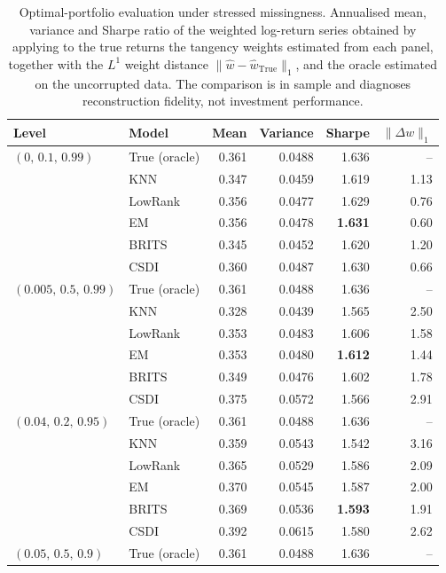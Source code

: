 \begin{table}[htbp]
  \centering
  \footnotesize
  \caption[Optimal-portfolio evaluation under stressed missingness]{Optimal-portfolio evaluation under stressed missingness. Annualised mean, variance and Sharpe ratio of the weighted log-return series obtained by applying to the true returns the tangency weights estimated from each panel, together with the $L^1$ weight distance $\lVert \hat w - \hat w_{\text{True}}\rVert_1$, and the oracle estimated on the uncorrupted data. The comparison is in sample and diagnoses reconstruction fidelity, not investment performance.}
  \label{tab:portfolio_stressed}
  \begin{tabular}{llrrrr}
    \toprule
    Level & Model & Mean & Variance & Sharpe & $\lVert \Delta w\rVert_1$ \\
    \midrule
    $(0,\, 0.1,\, 0.99)$ & True (oracle) & 0.361 & 0.0488 & 1.636 & -- \\
     & KNN & 0.347 & 0.0459 & 1.619 & 1.13 \\
     & LowRank & 0.356 & 0.0477 & 1.629 & 0.76 \\
     & EM & 0.356 & 0.0478 & \textbf{1.631} & 0.60 \\
     & BRITS & 0.345 & 0.0452 & 1.620 & 1.20 \\
     & CSDI & 0.360 & 0.0487 & 1.630 & 0.66 \\
    \midrule
    $(0.005,\, 0.5,\, 0.99)$ & True (oracle) & 0.361 & 0.0488 & 1.636 & -- \\
     & KNN & 0.328 & 0.0439 & 1.565 & 2.50 \\
     & LowRank & 0.353 & 0.0483 & 1.606 & 1.58 \\
     & EM & 0.353 & 0.0480 & \textbf{1.612} & 1.44 \\
     & BRITS & 0.349 & 0.0476 & 1.602 & 1.78 \\
     & CSDI & 0.375 & 0.0572 & 1.566 & 2.91 \\
    \midrule
    $(0.04,\, 0.2,\, 0.95)$ & True (oracle) & 0.361 & 0.0488 & 1.636 & -- \\
     & KNN & 0.359 & 0.0543 & 1.542 & 3.16 \\
     & LowRank & 0.365 & 0.0529 & 1.586 & 2.09 \\
     & EM & 0.370 & 0.0545 & 1.587 & 2.00 \\
     & BRITS & 0.369 & 0.0536 & \textbf{1.593} & 1.91 \\
     & CSDI & 0.392 & 0.0615 & 1.580 & 2.62 \\
    \midrule
    $(0.05,\, 0.5,\, 0.9)$ & True (oracle) & 0.361 & 0.0488 & 1.636 & -- \\

\end{tabular}
\end{table}
